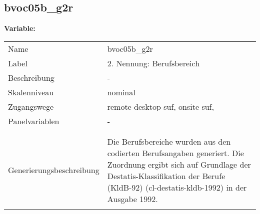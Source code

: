 	
	
	\subsection{bvoc05b\_g2r}
	\label{subSection:bvoc05b_g2r}

	\noindent\textbf{Variable:}\\
		\begin{tabular}{lL{11.3cm}}
			\label{tableVariable:bvoc05b_g2r}
			Name & bvoc05b\_g2r \\
			Label & 2. Nennung: Berufsbereich \\
			Beschreibung & - \\
			Skalenniveau & nominal \\
			Zugangswege &
				remote-desktop-suf,
				onsite-suf,
 \\
			Panelvariablen & -
			 \\
			 \\
 \\
					Generierungsbeschreibung & Die Berufsbereiche wurden aus den codierten Berufsangaben generiert. Die Zuordnung ergibt sich auf Grundlage der Destatis-Klassifikation der Berufe (KldB-92) (cl-destatis-kldb-1992) in der Ausgabe 1992. 
				 \\	
			 \\
		\end{tabular}






